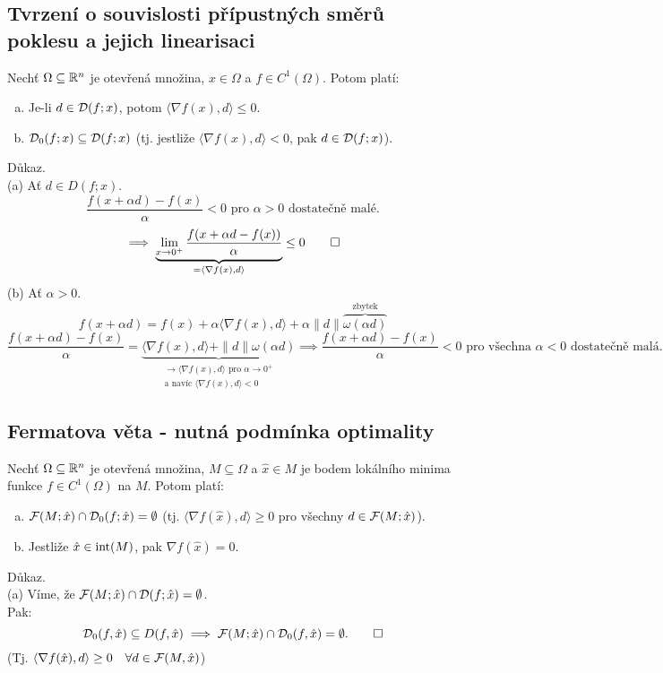 \subsection{Tvrzení o souvislosti přípustných směrů poklesu a jejich linearisaci}
Nechť $\Omega \subseteq \mathbb{R}^n$ je otevřená množina, $x \in \Omega$ a $f \in C^1(\Omega)$. Potom platí:
\begin{enumerate}[(a)]
    \item Je-li $d \in \mathcal{D}(f; x)$, potom $\langle \nabla f(x), d\rangle \leq 0$.
    \item $\mathcal{D}_0(f;x) \subseteq \mathcal{D}(f;x)$ (tj. jestliže $\langle \nabla f(x), d\rangle < 0$, pak $d \in \mathcal{D}(f;x)$).
\end{enumerate}
Důkaz.\\
(a) Ať $d \in D(f;x)$.
\[
    \frac{f(x + \alpha d) - f(x)}{\alpha} < 0 \text{ pro } \alpha > 0 \text{ dostatečně malé.}
\]
\[
    \implies \underbrace{\lim_{x\rightarrow 0^+ } \frac{f(x+\alpha d - f(x))}{\alpha}}_{= \langle \nabla f(x), d\rangle}
    \leq 0 \qed
\]
\newpage
(b) Ať $\alpha > 0$.
\[
    f(x+\alpha d) = f(x) + \alpha \langle \nabla f(x), d\rangle + \alpha \| d\|
    \overbrace{\omega (\alpha d)}^{\text{zbytek}}
\]
\[
    \frac{f(x+\alpha d) - f(x)}{\alpha} = \underbrace{\langle \nabla f(x), d\rangle + \| d\| \omega (\alpha d)}_{
    \substack{\rightarrow \langle \nabla f(x), d\rangle \text{ pro } \alpha \rightarrow 0^+ \\ \text{a navíc }
    \langle\nabla f(x), d \rangle < 0}} \implies \frac{f(x + \alpha d) - f(x)}{\alpha} < 0
    \text{ pro všechna } \alpha < 0 \text{ dostatečně malá.}
\]

\subsection{Fermatova věta - nutná podmínka optimality}
Nechť $\Omega \subseteq \mathbb{R}^n$ je otevřená množina, $M \subseteq \Omega$ a $\hat x \in M$ je bodem lokálního minima
funkce $f \in C^1(\Omega)$ na $M$. Potom platí:
\begin{enumerate}[(a)]
    \item $\mathcal{F}(M; \hat x) \cap \mathcal{D}_0(f; \hat x) = \emptyset$ (tj. $\langle \nabla f(\hat x), d\rangle \geq 0$ pro všechny
    $d \in \mathcal{F}(M; \hat x)$).
    \item Jestliže $\hat x \in \operatorname{int}(M)$, pak $\nabla f(\hat x) = 0$.
\end{enumerate}
Důkaz.\\
(a) Víme, že $\mathcal{F}(M; \hat x) \cap \mathcal{D}(f; \hat x) = \emptyset$.\\ \label{fermatA}
Pak:
\[
    \mathcal{D}_0 (f, \hat x) \subseteq D(f, \hat x) \implies \mathcal{F}(M; \hat x) \cap \mathcal{D}_0(f, \hat x) = \emptyset. \qed
\]
(Tj. $\langle \nabla f(\hat x), d\rangle \geq 0 \quad \forall d \in \mathcal{F}(M, \hat x)$)

